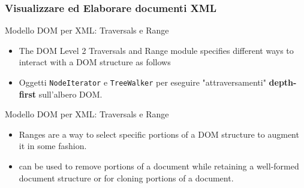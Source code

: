 \begin{frame}
    \frametitle{Visualizzare ed Elaborare documenti XML}
    \addtocounter{nframe}{1}
    

     \begin{block}{Modello DOM per XML: Traversals e Range}
        \begin{itemize}
            \item The DOM Level 2 Traversals and Range module specifies different ways to interact with a DOM structure as follows
            \item Oggetti \texttt{NodeIterator} e \texttt{TreeWalker} per eseguire "attraversamenti" \textbf{depth-first} sull'albero DOM.
        \end{itemize}
       
     \end{block}

     \begin{block}{Modello DOM per XML: Traversals e Range}
        \begin{itemize}
            \item Ranges are a way to select specific portions of a DOM structure to augment it in some fashion.
            \item can be used to remove portions of a document while retaining a well-formed document structure or for cloning portions of a document.
        \end{itemize}
       
     \end{block}

     
\end{frame}


